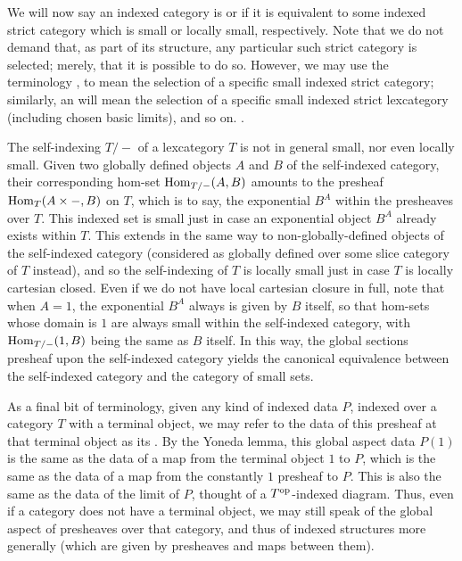 We will now say an indexed category is  or  if it is equivalent to some indexed strict category which is small or locally small, respectively. Note that we do not demand that, as part of its structure, any particular such strict category is selected; merely, that it is possible to do so. However, we may use the terminology , to mean the selection of a specific small indexed strict category; similarly, an  will mean the selection of a specific small indexed strict lexcategory (including chosen basic limits), and so on. .

The self-indexing $T/-$ of a lexcategory $T$ is not in general small, nor even locally small. Given two globally defined objects $A$ and $B$ of the self-indexed category, their corresponding hom-set $\operatorname{Hom}_{T/-}(A, B)$ amounts to the presheaf $\operatorname{Hom}_{T}(A \times -, B)$ on $T$, which is to say, the exponential $B^A$ within the presheaves over $T$. This indexed set is small just in case an exponential object $B^A$ already exists within $T$. This extends in the same way to non-globally-defined objects of the self-indexed category (considered as globally defined over some slice category of $T$ instead), and so the self-indexing of $T$ is locally small just in case $T$ is locally cartesian closed. Even if we do not have local cartesian closure in full, note that when $A = 1$, the exponential $B^A$ always is given by $B$ itself, so that hom-sets whose domain is $1$ are always small within the self-indexed category, with $\operatorname{Hom}_{T/-}(1, B)$ being the same as $B$ itself. In this way, the global sections presheaf upon the self-indexed category yields the canonical equivalence between the self-indexed category and the category of small sets.

As a final bit of terminology, given any kind of indexed data $P$, indexed over a category $T$ with a terminal object, we may refer to the data of this presheaf at that terminal object as its . By the Yoneda lemma, this global aspect data $P(1)$ is the same as the data of a map from the terminal object $1$ to $P$, which is the same as the data of a map from the constantly $1$ presheaf to $P$. This is also the same as the data of the limit of $P$, thought of a $T^{\mathrm{op}}$-indexed diagram. Thus, even if a category does not have a terminal object, we may still speak of the global aspect of presheaves over that category, and thus of indexed structures more generally (which are given by presheaves and maps between them).


